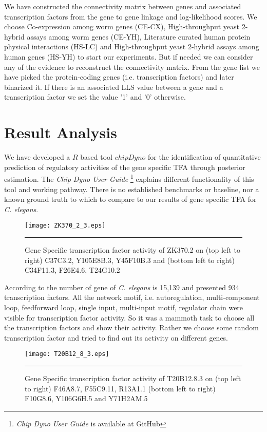 We have constructed the connectivity matrix between genes and associated transcription factors from the gene to gene linkage and log-likelihood scores. We choose Co-expression among worm genes (CE-CX), High-throughput yeast 2-hybrid assays among worm genes (CE-YH), Literature curated human protein physical interactions (HS-LC) and High-throughput yeast 2-hybrid assays among human genes (HS-YH) to start our experiments. But if needed we can consider any of the evidence to reconstruct the connectivity matrix. From the gene list we have picked the protein-coding genes (i.e. transcription factors) and later 
binarized it. If there is an associated LLS value between a gene and a transcription factor we set the value '1' and '0' otherwise.

\section{Result Analysis}
We have developed a $R$ based tool $chipDyno$ for the identification of quantitative prediction of regulatory activities of the gene specific TFA through posterior estimation. The \textit{Chip Dyno User Guide} \footnote{\textit{Chip Dyno User Guide} is available at GitHub} explains different functionality of this tool and working pathway. There is no established benchmarks or baseline, nor a known ground truth to which to compare to our results of gene specific TFA for \textit{C. elegans}.

\begin{figure}
	\centering
		\texttt{[image: ZK370\_2\_3.eps]}
		\rule{35em}{0.5pt}
	\caption[Gene Specific transcription factor activity of ZK370.2]
		{Gene Specific transcription factor activity of ZK370.2 on (top left to right) C37C3.2, Y105E8B.3, Y45F10B.3 and (bottom left to right) C34F11.3, F26E4.6, T24G10.2}
	\label{fig:TFA_of_of_ZK370.2}
\end{figure}

According to \cite{WormNet} the number of gene of \textit{C. elegans} is 15,139 and \cite{Inmaculada:2007} presented 934 transcription factors. All the network motif, i.e. autoregulation, multi-component loop, feedforward loop, single input, multi-input motif, regulator chain were visible for transcription factor activity. So it was a mammoth task to choose all the transcription factors and show their activity. Rather we choose some random transcription factor and tried to find out its activity on different genes.

\begin{figure}
	\centering
		\texttt{[image: T20B12\_8\_3.eps]}
		\rule{35em}{0.5pt}
	\caption[Gene Specific transcription factor activity of T20B12.8.3]
		{Gene Specific transcription factor activity of T20B12.8.3 on (top left to right) F46A8.7, F55C9.11, R13A1.1 (bottom left to right) F10G8.6, Y106G6H.5 and Y71H2AM.5}
	\label{fig:TFA_of_of_T20B12_8_3}
\end{figure}

